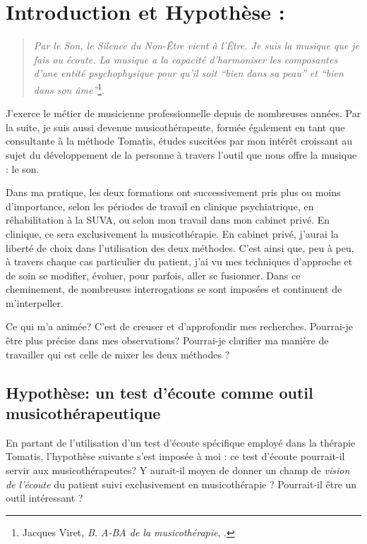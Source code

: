 \chapter{Introduction et Hypothèse : }
\begin{quotation}
\emph{Par le Son, le Silence du Non-Être vient à l'Être. Je suis
la musique que je fais ou écoute. La musique a la capacité d'harmoniser
les composantes d'une entité psychophysique pour qu'il soit ``bien
dans sa peau'' et ``bien dans son âme''}\footnote{Jacques Viret, \emph{B. A-BA de la musicothérapie}, \cite{Viret2007}.}.
\end{quotation}
J'exerce le métier de musicienne professionnelle depuis de nombreuses
années. Par la suite, je suis aussi devenue musicothérapeute, formée
également en tant que consultante à la méthode Tomatis, études suscitées
par mon intérêt croissant au sujet du développement de la personne
à travers l'outil que nous offre la musique : le son.

Dans ma pratique, les deux formations ont successivement pris plus
ou moins d'importance, selon les périodes de travail en clinique psychiatrique,
en réhabilitation à la SUVA, ou selon mon travail dans mon cabinet
privé. En clinique, ce sera exclusivement la musicothérapie. En cabinet
privé, j'aurai la liberté de choix dans l'utilisation des deux méthodes.
C'est ainsi que, peu à peu, à travers chaque cas particulier du patient,
j'ai vu mes techniques d'approche et de soin se modifier, évoluer,
pour parfois, aller se fusionner. Dans ce cheminement, de nombreuses
interrogations se sont imposées et continuent de m'interpeller.

Ce qui m'a animée? C'est de creuser et d'approfondir mes recherches.
Pourrai-je être plus précise dans mes observations? Pourrai-je clarifier ma manière de travailler qui est celle de mixer les deux méthodes ?

\section{Hypothèse: un test d'écoute comme outil musicothérapeutique}


En partant de l'utilisation d'un test d'écoute spécifique employé
dans la thérapie Tomatis, l'hypothèse suivante s'est imposée à moi : ce test d'écoute
pourrait-il servir aux musicothérapeutes? Y aurait-il moyen de donner
un champ de \emph{vision de l'écoute }du patient suivi exclusivement
en musicothérapie ? Pourrait-il être un outil intéressant ? 


